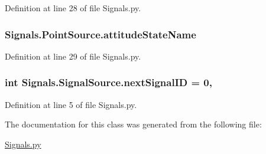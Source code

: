 Definition at line 28 of file Signals.\+py.

\subsubsection[{\texorpdfstring{attitude\+State\+Name}{attitudeStateName}}]{\setlength{\rightskip}{0pt plus 5cm}Signals.\+Point\+Source.\+attitude\+State\+Name}\hypertarget{classSignals_1_1PointSource_a151f2600c3623d1ca49fb51feb8a1178}{}\label{classSignals_1_1PointSource_a151f2600c3623d1ca49fb51feb8a1178}


Definition at line 29 of file Signals.\+py.

\subsubsection[{\texorpdfstring{next\+Signal\+ID}{nextSignalID}}]{\setlength{\rightskip}{0pt plus 5cm}int Signals.\+Signal\+Source.\+next\+Signal\+ID = 0\hspace{0.3cm}{\ttfamily [static]}, {\ttfamily [inherited]}}\hypertarget{classSignals_1_1SignalSource_abcff0d069f17cb5ebe3eff15b6283a64}{}\label{classSignals_1_1SignalSource_abcff0d069f17cb5ebe3eff15b6283a64}


Definition at line 5 of file Signals.\+py.



The documentation for this class was generated from the following file\+:\begin{DoxyCompactItemize}
\item 
\hyperlink{Signals_8py}{Signals.\+py}\end{DoxyCompactItemize}
